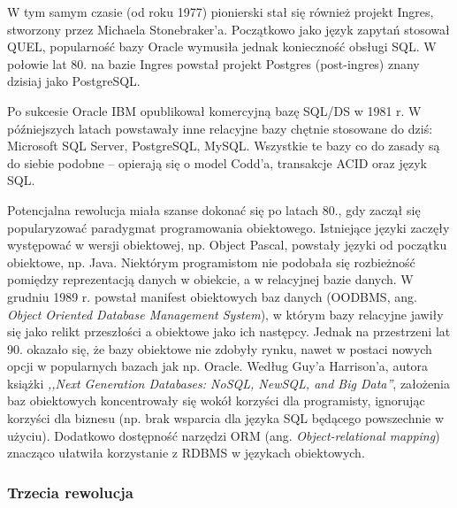 \documentclass[12pt,a4paper,twoside,titlepage,openright]{book}
\begin{document}
W tym samym czasie (od roku 1977) pionierski stał się również projekt Ingres, stworzony przez Michaela Stonebraker'a. Początkowo jako język zapytań stosował QUEL, popularność bazy Oracle wymusiła jednak konieczność obsługi SQL. W połowie lat 80. na bazie Ingres powstał projekt Postgres (post-ingres) znany dzisiaj jako PostgreSQL. 

Po sukcesie Oracle IBM opublikował komercyjną bazę SQL/DS w 1981 r. W późniejszych latach powstawały inne relacyjne bazy chętnie stosowane do dziś: Microsoft SQL Server, PostgreSQL, MySQL. Wszystkie te bazy co do zasady są do siebie podobne -- opierają się o model Codd'a, transakcje ACID oraz język SQL. \cite{relationalDbs}

Potencjalna rewolucja miała szanse dokonać się po latach 80., gdy zaczął się popularyzować paradygmat programowania obiektowego. Istniejące języki zaczęły występować w wersji obiektowej, np. Object Pascal, powstały języki od początku obiektowe, np. Java. Niektórym programistom nie podobała się rozbieżność pomiędzy reprezentacją danych w obiekcie, a w relacyjnej bazie danych. W grudniu 1989 r. powstał manifest obiektowych baz danych (OODBMS, ang. \textit{Object Oriented Database Management System}), w którym bazy relacyjne jawiły się jako relikt przeszłości a obiektowe jako ich następcy.\cite{oodbmsManifesto} Jednak na przestrzeni lat 90. okazało się, że bazy obiektowe nie zdobyły rynku, nawet w postaci nowych opcji w popularnych bazach jak np. Oracle. Według Guy'a Harrison'a, autora książki \textit{,,Next Generation Databases: NoSQL, NewSQL, and Big Data''}, założenia baz obiektowych koncentrowały się wokół korzyści dla programisty, ignorując korzyści dla biznesu (np. brak wsparcia dla języka SQL będącego powszechnie w użyciu). Dodatkowo dostępność narzędzi ORM (ang. \textit{Object-relational mapping}) znacząco ułatwiła korzystanie z RDBMS w językach obiektowych.

\subsubsection{Trzecia rewolucja}
\end{document}
